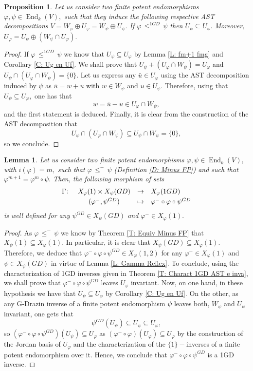 \documentclass[10pt,a4paper]{amsart}
\newtheorem{lem}[defn]{Lemma}
\newtheorem{prop}[defn]{Proposition}
\theoremstyle{plain}
\theoremstyle{remark}
\numberwithin{equation}{section} \numberwithin{defn}{section}
\newcommand\ed{\operatorname{End}}
\newcommand{\f}{\varphi}
\newcommand{\g}{\psi}
\begin{document}
\begin{prop}\label{P: Descomp Uf}
Let us consider two finite potent endomorphisms $\f, \g \in \ed_k(V),$  such that they induce the following respective AST decompositions $V=W_{\f}\oplus U_{\f}=W_{\g}\oplus U_{\g}.$ If $\f \, \leq^{1GD} \, \g$ then $U_{\g}\subseteq U_{\f}.$  Moreover, $U_{\f}=U_{\g}\oplus (W_{\g}\cap U_{\f}).$ 
\end{prop}
\begin{proof}
If $\f \, \leq^{1GD} \, \g$ we know that $U_{\g}\subseteq U_{\f}$ by Lemma \ref{L: fm+1 fmg} and Corollary \ref{C: Ug en Uf}.
We shall prove that $U_{\g}+(U_{\f}\cap W_{\g})=U_{\f}$ and $U_{\g}\cap (U_{\f}\cap W_{\g})=\{0\}.$ Let us express any $\bar{u}\in U_{\f}$ using the AST decomposition induced by $\g$ as $\bar{u}=w+u$ with $w\in W_{\g}$ and $u\in U_{\g}.$ Therefore, using that $U_{\g}\subseteq U_{\f},$ one has that $$w=\bar{u}-u\in U_{\f}\cap W_{\g}, $$ and the first statement is deduced. Finally, it is clear from the construction of the AST decomposition that $$U_{\g}\cap (U_{\f}\cap W_{\g})\subseteq U_{\g}\cap W_{\g}=\{0\}, $$ so we conclude. 
\end{proof}

\begin{lem}\label{L: fmenos f g gdraz}
Let us consider two finite potent endomorphisms $\f, \g \in \ed_k(V),$ with $i(\f)=m,$ such that $\f\, \leq^{-}\, \g$ (Definition \ref{D: Minus FP}) and such that $\f^{m+1}=\f^m\circ \g .$  Then, the following morphism of sets $$\begin{array}{rccl}
\Gamma \colon & X_{\f}(1)\times X_{\g}(GD)  & \rightarrow & X_{\f}(1GD)\smallskip\\
& (\f^{-},\g^{GD}) & \mapsto & \f^{-}\circ \f \circ \g^{GD}
\end{array} $$ is well defined for any $\g^{GD}\in X_{\g}(GD)$ and $\f^-\in X_{\f}(1).$
\end{lem}
\begin{proof}
As $\f \, \leq^{-} \, \g$ we know by Theorem \ref{T: Equiv Minus FP} that $X_{\g}(1)\subseteq X_{\f}(1).$ In particular, it is clear that $X_{\g}(GD)\subseteq X_{\f}(1).$ Therefore, we deduce that $\f^{-}\circ \f \circ \g^{GD}\in X_{\f}(1,2)$ for any $\f^-\in X_{\f}(1)$ and $\g \in X_{\g}(GD)$ in virtue of Lemma \ref{L: Gamma Reflex}. To conclude, using the characterization of 1GD inverses given in Theorem \ref{T: Charact 1GD AST e inva}, we shall prove that $\f^{-}\circ \f \circ \g^{GD}$ leaves $U_{\f}$ invariant. Now, on one hand, in these hypothesis we have that $U_{\g}\subseteq U_{\f}$ by Corollary \ref{C: Ug en Uf}. On the other, as any G-Drazin inverse of a finite potent endomorphism $\g$ leaves both, $W_{\g}$ and $U_{\g}$ invariant, one gets that $$\g^{GD}(U_{\g})\subseteq U_{\g}\subseteq U_{\f}, $$ so $(\f^-\circ \f \circ \g^{GD})(U_{\g})\subseteq U_{\f}$ as $(\f^-\circ \f)(U_{\f})\subseteq U_{\f}$ by the construction of the Jordan basis of $U_{\f}$ and the characterization of the $\{1\}-$inverses of a finite potent endomorphism over it. Hence, we conclude that $\f^-\circ \f \circ \g^{GD}$ is a 1GD inverse.
\end{proof}
\end{document}
